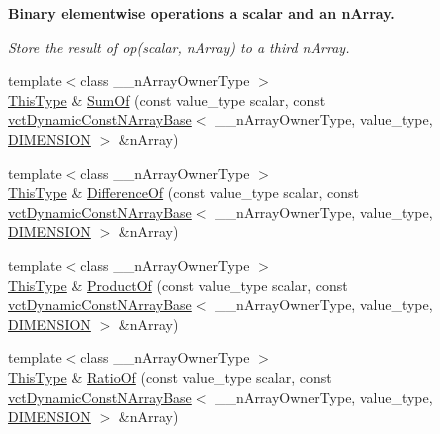 \begin{Indent}{\bf Binary elementwise operations a scalar and an n\-Array.}\par
{\em Store the result of op(scalar, n\-Array) to a third n\-Array. }\begin{DoxyCompactItemize}
\item 
{\footnotesize template$<$class \-\_\-\-\_\-n\-Array\-Owner\-Type $>$ }\\\hyperlink{classvct_dynamic_const_n_array_base_a5123caffcf1455a1b99003877eade897}{This\-Type} \& \hyperlink{classvct_dynamic_n_array_base_adf34c165d5ebfabe1e5503861df394de}{Sum\-Of} (const value\-\_\-type scalar, const \hyperlink{classvct_dynamic_const_n_array_base}{vct\-Dynamic\-Const\-N\-Array\-Base}$<$ \-\_\-\-\_\-n\-Array\-Owner\-Type, value\-\_\-type, \hyperlink{classvct_dynamic_n_array_base_aa66532d28588bdf26d08fb593db815d6abfcde386ec801b212d7c42d63a4f3837}{D\-I\-M\-E\-N\-S\-I\-O\-N} $>$ \&n\-Array)
\item 
{\footnotesize template$<$class \-\_\-\-\_\-n\-Array\-Owner\-Type $>$ }\\\hyperlink{classvct_dynamic_const_n_array_base_a5123caffcf1455a1b99003877eade897}{This\-Type} \& \hyperlink{classvct_dynamic_n_array_base_ae3bf1a4f57b37308c080a6952be5426a}{Difference\-Of} (const value\-\_\-type scalar, const \hyperlink{classvct_dynamic_const_n_array_base}{vct\-Dynamic\-Const\-N\-Array\-Base}$<$ \-\_\-\-\_\-n\-Array\-Owner\-Type, value\-\_\-type, \hyperlink{classvct_dynamic_n_array_base_aa66532d28588bdf26d08fb593db815d6abfcde386ec801b212d7c42d63a4f3837}{D\-I\-M\-E\-N\-S\-I\-O\-N} $>$ \&n\-Array)
\item 
{\footnotesize template$<$class \-\_\-\-\_\-n\-Array\-Owner\-Type $>$ }\\\hyperlink{classvct_dynamic_const_n_array_base_a5123caffcf1455a1b99003877eade897}{This\-Type} \& \hyperlink{classvct_dynamic_n_array_base_aa1dfbcdb1d5003c1154a15c766206b45}{Product\-Of} (const value\-\_\-type scalar, const \hyperlink{classvct_dynamic_const_n_array_base}{vct\-Dynamic\-Const\-N\-Array\-Base}$<$ \-\_\-\-\_\-n\-Array\-Owner\-Type, value\-\_\-type, \hyperlink{classvct_dynamic_n_array_base_aa66532d28588bdf26d08fb593db815d6abfcde386ec801b212d7c42d63a4f3837}{D\-I\-M\-E\-N\-S\-I\-O\-N} $>$ \&n\-Array)
\item 
{\footnotesize template$<$class \-\_\-\-\_\-n\-Array\-Owner\-Type $>$ }\\\hyperlink{classvct_dynamic_const_n_array_base_a5123caffcf1455a1b99003877eade897}{This\-Type} \& \hyperlink{classvct_dynamic_n_array_base_a9b6660dfcc04e155fac6b2af58b5b743}{Ratio\-Of} (const value\-\_\-type scalar, const \hyperlink{classvct_dynamic_const_n_array_base}{vct\-Dynamic\-Const\-N\-Array\-Base}$<$ \-\_\-\-\_\-n\-Array\-Owner\-Type, value\-\_\-type, \hyperlink{classvct_dynamic_n_array_base_aa66532d28588bdf26d08fb593db815d6abfcde386ec801b212d7c42d63a4f3837}{D\-I\-M\-E\-N\-S\-I\-O\-N} $>$ \&n\-Array)

\end{DoxyCompactItemize}
\end{Indent}
